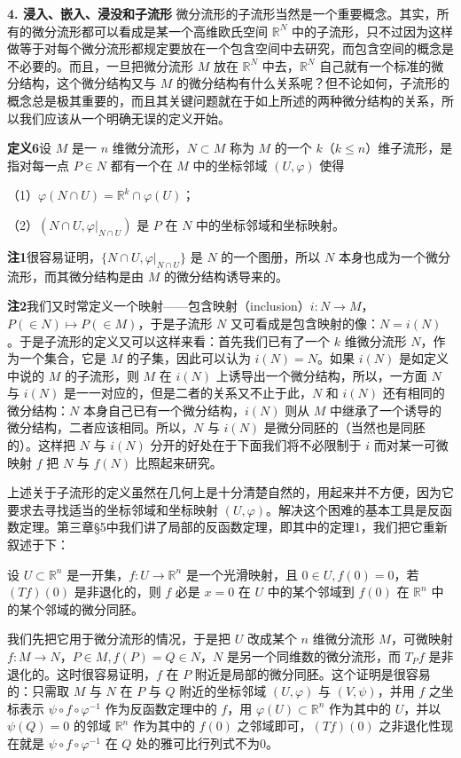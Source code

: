 \noindent\textbf{4. 浸入、嵌入、浸没和子流形}\quad
微分流形的子流形当然是一个重要概念。其实，所有的微分流形都可以看成是某一个高维欧氏空间 $\mathbb R^N$ 中的子流形，只不过因为这样做等于对每个微分流形都规定要放在一个包含空间中去研究，而包含空间的概念是不必要的。而且，一旦把微分流形 $M$ 放在 $\mathbb R^N$ 中去，$\mathbb R^N$ 自己就有一个标准的微分结构，这个微分结构又与 $M$ 的微分结构有什么关系呢？但不论如何，子流形的概念总是极其重要的，而且其关键问题就在于如上所述的两种微分结构的关系，所以我们应该从一个明确无误的定义开始。

\noindent\textbf{定义6}\quad 设 $M$ 是一 $n$ 维微分流形，$N\subset M$ 称为 $M$ 的一个 $k$（$k\le n$）维子流形，是指对每一点 $P\in N$ 都有一个在 $M$ 中的坐标邻域 $(U,\varphi)$ 使得

（1）$\varphi(N\cap U)=\mathbb R^k\cap\varphi(U)$；

（2）$(N\cap U,\varphi|_{N\cap U})$ 是 $P$ 在 $N$ 中的坐标邻域和坐标映射。

\noindent\textbf{注1}\quad 很容易证明，$\{N\cap U,\varphi|_{N\cap U}\}$ 是 $N$ 的一个图册，所以 $N$ 本身也成为一个微分流形，而其微分结构是由 $M$ 的微分结构诱导来的。

\noindent\textbf{注2}\quad 我们又时常定义一个映射——包含映射（inclusion）$i:N\to M$，$P(\in N)\mapsto P(\in M)$，于是子流形 $N$ 又可看成是包含映射的像：$N=i(N)$。于是子流形的定义又可以这样来看：首先我们已有了一个 $k$ 维微分流形 $N$，作为一个集合，它是 $M$ 的子集，因此可以认为 $i(N)=N$。如果 $i(N)$ 是如定义中说的 $M$ 的子流形，则 $M$ 在 $i(N)$ 上诱导出一个微分结构，所以，一方面 $N$ 与 $i(N)$ 是一一对应的，但是二者的关系又不止于此，$N$ 和 $i(N)$ 还有相同的微分结构：$N$ 本身自己已有一个微分结构，$i(N)$ 则从 $M$ 中继承了一个诱导的微分结构，二者应该相同。所以，$N$ 与 $i(N)$ 是微分同胚的（当然也是同胚的）。这样把 $N$ 与 $i(N)$ 分开的好处在于下面我们将不必限制于 $i$ 而对某一可微映射 $f$ 把 $N$ 与 $f(N)$ 比照起来研究。

上述关于子流形的定义虽然在几何上是十分清楚自然的，用起来并不方便，因为它要求去寻找适当的坐标邻域和坐标映射 $(U,\varphi)$。解决这个困难的基本工具是反函数定理。第三章§5中我们讲了局部的反函数定理，即其中的定理1，我们把它重新叙述于下：

设 $U\subset\mathbb R^n$ 是一开集，$f:U\to\mathbb R^n$ 是一个光滑映射，且 $0\in U,f(0)=0$，若 $(Tf)(0)$ 是非退化的，则 $f$ 必是 $x=0$ 在 $U$ 中的某个邻域到 $f(0)$ 在 $\mathbb R^n$ 中的某个邻域的微分同胚。

我们先把它用于微分流形的情况，于是把 $U$ 改成某个 $n$ 维微分流形 $M$，可微映射 $f:M\to N$，$P\in M,f(P)=Q\in N$，$N$ 是另一个同维数的微分流形，而 $T_Pf$ 是非退化的。这时很容易证明，$f$ 在 $P$ 附近是局部的微分同胚。这个证明是很容易的：只需取 $M$ 与 $N$ 在 $P$ 与 $Q$ 附近的坐标邻域 $(U,\varphi)$ 与 $(V,\psi)$，并用 $f$ 之坐标表示 $\psi\circ f\circ\varphi^{-1}$ 作为反函数定理中的 $f$，用 $\varphi(U)\subset\mathbb R^n$ 作为其中的 $U$，并以 $\psi(Q)=0$ 的邻域 $\mathbb R^n$ 作为其中的 $f(0)$ 之邻域即可，$(Tf)(0)$ 之非退化性现在就是 $\psi\circ f\circ\varphi^{-1}$ 在 $Q$ 处的雅可比行列式不为0。

